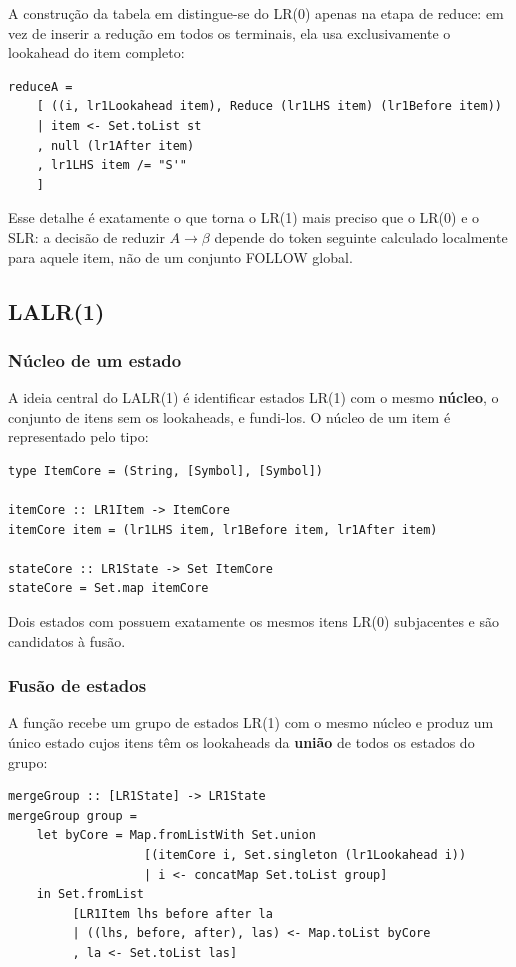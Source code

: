 A construção da tabela em
 distingue-se do LR(0)
apenas na etapa de reduce: em vez de inserir a redução em todos os
terminais, ela usa exclusivamente o lookahead do item completo:

\begin{verbatim}
reduceA =
    [ ((i, lr1Lookahead item), Reduce (lr1LHS item) (lr1Before item))
    | item <- Set.toList st
    , null (lr1After item)
    , lr1LHS item /= "S'"
    ]
\end{verbatim}

Esse detalhe é exatamente o que torna o LR(1) mais preciso que o
LR(0) e o SLR: a decisão de reduzir \(A \to \beta\) depende do token
seguinte calculado localmente para aquele item, não de um conjunto
FOLLOW global.

\subsection{LALR(1)}

\subsubsection{Núcleo de um estado}

A ideia central do LALR(1) é identificar estados LR(1) com o mesmo
\textbf{núcleo}, o conjunto de itens sem os lookaheads, e
fundi-los. O núcleo de um item é representado pelo tipo:

\begin{verbatim}
type ItemCore = (String, [Symbol], [Symbol])

itemCore :: LR1Item -> ItemCore
itemCore item = (lr1LHS item, lr1Before item, lr1After item)

stateCore :: LR1State -> Set ItemCore
stateCore = Set.map itemCore
\end{verbatim}

Dois estados com  possuem
exatamente os mesmos itens LR(0) subjacentes e são
candidatos à fusão.

\subsubsection{Fusão de estados}

A função  recebe um grupo de
estados LR(1) com o mesmo núcleo e produz um único estado cujos itens
têm os lookaheads da \textbf{união} de todos os estados do grupo:

\begin{verbatim}
mergeGroup :: [LR1State] -> LR1State
mergeGroup group =
    let byCore = Map.fromListWith Set.union
                   [(itemCore i, Set.singleton (lr1Lookahead i))
                   | i <- concatMap Set.toList group]
    in Set.fromList
         [LR1Item lhs before after la
         | ((lhs, before, after), las) <- Map.toList byCore
         , la <- Set.toList las]
\end{verbatim}

